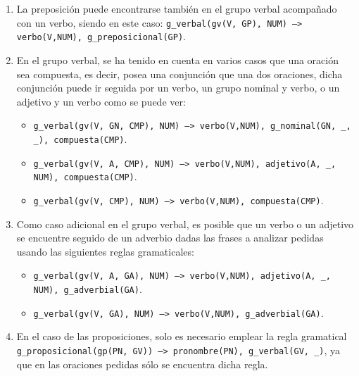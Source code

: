 \documentclass[a4paper]{article}
\begin{document}
\begin{enumerate}
\begin{itemize}
            \end{itemize}

        \item La preposición puede encontrarse también en el grupo verbal acompañado con un verbo, siendo en este caso: \texttt{g\_verbal(gv(V, GP), NUM) --> verbo(V,NUM), g\_preposicional(GP)}.

        \item En el grupo verbal, se ha tenido en cuenta en varios casos que una oración sea compuesta, es decir, posea una conjunción que una dos oraciones, dicha conjunción puede ir seguida por un verbo, un grupo nominal y verbo, o un adjetivo y un verbo como se puede ver:

            \begin{itemize}

                \item \texttt{g\_verbal(gv(V, GN, CMP), NUM) --> verbo(V,NUM), g\_nominal(GN, \_, \_), compuesta(CMP)}.

                \item \texttt{g\_verbal(gv(V, A, CMP), NUM) --> verbo(V,NUM), adjetivo(A, \_, NUM), compuesta(CMP)}.

                \item \texttt{g\_verbal(gv(V, CMP), NUM) --> verbo(V,NUM), compuesta(CMP)}.

            \end{itemize}

        \item Como caso adicional en el grupo verbal, es posible que un verbo o un adjetivo se encuentre seguido de un adverbio dadas las frases a analizar pedidas usando las siguientes reglas gramaticales:

            \begin{itemize}

                \item \texttt{g\_verbal(gv(V, A, GA), NUM) --> verbo(V,NUM), adjetivo(A, \_, NUM), g\_adverbial(GA)}.

                \item \texttt{g\_verbal(gv(V, GA), NUM) --> verbo(V,NUM), g\_adverbial(GA)}.

            \end{itemize}

        \item En el caso de las proposiciones, solo es necesario emplear la regla gramatical \texttt{g\_proposicional(gp(PN, GV)) --> pronombre(PN), g\_verbal(GV, \_)}, ya que en las oraciones pedidas sólo se encuentra dicha regla.


\end{enumerate}
\end{document}
